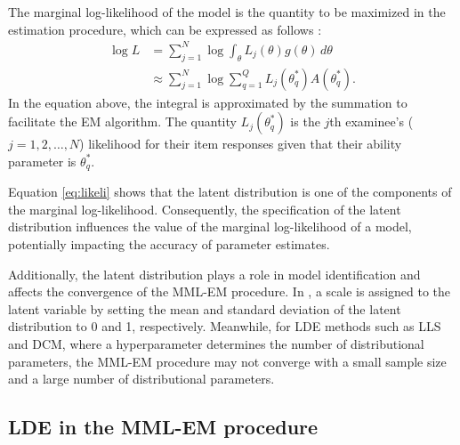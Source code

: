 The marginal log-likelihood of the model is the quantity to be maximized
in the estimation procedure, which can be expressed as follows
\citep{Baker+Kim:2004}:
\begin{equation}
\begin{split}
\log L &= \sum_{j = 1}^{N}
{ \log{ \int_{\theta}{ L_j (\theta) g (\theta) \, d \theta } } } \\
&\approx \sum_{j = 1}^{N}
{ \log{ \sum_{q = 1}^{Q}{ L_j{\left( \theta^{*}_{q} \right)}
A{\left( \theta^{*}_{q} \right)} } } }.
\end{split}
\label{eq:likeli}
\end{equation}
In the equation above, the integral is approximated by the summation
to facilitate the EM algorithm. The quantity
\(L_j{\left( \theta^{*}_{q} \right)}\) is the \(j\)th examinee's
(\(j = 1, 2, \dots, N\)) likelihood for their item responses given
that their ability parameter is \(\theta^{*}_{q}\).

Equation \eqref{eq:likeli} shows that the latent distribution is one of the
components of the marginal log-likelihood. Consequently, the specification of the
latent distribution influences the value of the marginal log-likelihood of a
model, potentially impacting the accuracy of parameter estimates.

Additionally, the latent distribution plays a role in model identification and
affects the convergence of the MML-EM procedure.
In , a scale is assigned to the latent variable by setting the mean and
standard deviation of the latent distribution to 0 and 1, respectively.
Meanwhile, for LDE methods such as LLS and DCM, where a hyperparameter
determines the number of distributional parameters, the MML-EM procedure may
not converge with a small sample size and a large number of distributional
parameters.

\hypertarget{lde-in-the-mml-em-procedure}{%
\subsection{LDE in the MML-EM procedure}\label{lde-in-the-mml-em-procedure}}

